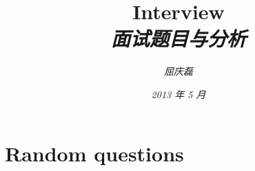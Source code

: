 \documentclass{article}
\begin{document}
\title{%
  {\huge \textsf{Interview}\\\smallskip}%
  {\small \textit{面试题目与分析}}
}

\author{\textit{屈庆磊}\\[2mm]
       }

\date{\textit{2013 年 5 月}}

\maketitle
\newpage
\begin{multicols}{2}
\tableofcontents
\end{multicols}
\newpage 

\section{Random questions}
\end{document}
